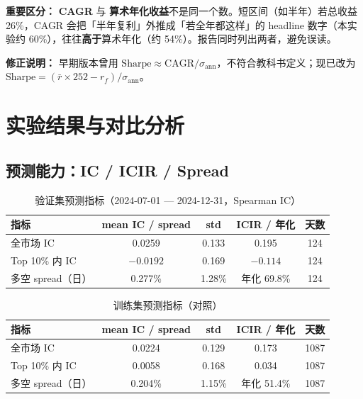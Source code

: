 \documentclass[UTF8,a4paper,12pt]{ctexart}
\begin{document}
\textbf{重要区分：} \textbf{CAGR} 与 \textbf{算术年化收益}不是同一个数。短区间（如半年）若总收益 26\%，CAGR 会把「半年复利」外推成「若全年都这样」的 headline 数字（本实验约 60\%），往往\textbf{高于}算术年化（约 54\%）。报告同时列出两者，避免误读。

\textbf{修正说明：} 早期版本曾用 $\mathrm{Sharpe}\approx \mathrm{CAGR}/\sigma_{\mathrm{ann}}$，不符合教科书定义；现已改为 $\mathrm{Sharpe}=(\bar{r}\times 252-r_f)/\sigma_{\mathrm{ann}}$。

\section{实验结果与对比分析}

\subsection{预测能力：IC / ICIR / Spread}

\begin{table}[H]
\centering
\caption{验证集预测指标（2024-07-01 --- 2024-12-31，Spearman IC）}
\label{tab:ic}
\begin{tabular}{lcccc}
\toprule
\textbf{指标} & \textbf{mean IC / spread} & \textbf{std} & \textbf{ICIR / 年化} & \textbf{天数} \\
\midrule
全市场 IC     & 0.0259 & 0.133 & 0.195 & 124 \\
Top 10\% 内 IC & $-0.0192$ & 0.169 & $-0.114$ & 124 \\
多空 spread（日） & 0.277\% & 1.28\% & 年化 69.8\% & 124 \\
\bottomrule
\end{tabular}
\end{table}

\begin{table}[H]
\centering
\caption{训练集预测指标（对照）}
\label{tab:ic-train}
\begin{tabular}{lcccc}
\toprule
\textbf{指标} & \textbf{mean IC / spread} & \textbf{std} & \textbf{ICIR / 年化} & \textbf{天数} \\
\midrule
全市场 IC     & 0.0224 & 0.129 & 0.173 & 1087 \\
Top 10\% 内 IC & 0.0058 & 0.168 & 0.034 & 1087 \\
多空 spread（日） & 0.204\% & 1.15\% & 年化 51.4\% & 1087 \\
\bottomrule
\end{tabular}
\end{table}
\end{document}
